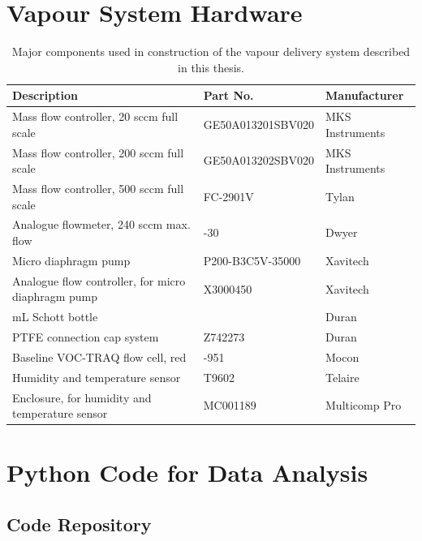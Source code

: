 \documentclass[
  a4paper,
]{scrbook}
\begin{document}
\cleardoublepage
{}
{}
\appendix

\hypertarget{sec-vapour-sensor-components}{%
\chapter{Vapour System Hardware}\label{sec-vapour-sensor-components}}

\hypertarget{tbl-vapour-sensor-components}{}
\begin{longtable}[t]{>{\raggedright\arraybackslash}p{5.5cm}>{\raggedright\arraybackslash}p{4.5cm}>{\raggedright\arraybackslash}p{3.75cm}}
\caption{\label{tbl-vapour-sensor-components}Major components used in construction of the vapour delivery system
described in this thesis. }\tabularnewline

\toprule
Description & Part No. & Manufacturer\\
\midrule
Mass flow controller, 20 sccm full scale & GE50A013201SBV020 & MKS Instruments\\
Mass flow controller, 200 sccm full scale & GE50A013202SBV020 & MKS Instruments\\
Mass flow controller, 500 sccm full scale & FC-2901V & Tylan\\
Analogue flowmeter, 240 sccm max. flow & 116261-30 & Dwyer\\
Micro diaphragm pump & P200-B3C5V-35000 & Xavitech\\
\addlinespace
Analogue flow controller, for micro diaphragm pump & X3000450 & Xavitech\\
10 mL Schott bottle & 218010802 & Duran\\
PTFE connection cap system & Z742273 & Duran\\
Baseline VOC-TRAQ flow cell, red & 043-951 & Mocon\\
Humidity and temperature sensor & T9602 & Telaire\\
\addlinespace
Enclosure, for humidity and temperature sensor & MC001189 & Multicomp Pro\\
\bottomrule
\end{longtable}

\hypertarget{sec-python}{%
\chapter{Python Code for Data Analysis}\label{sec-python}}

\hypertarget{code-repository}{%
\section{Code Repository}\label{code-repository}}
\end{document}
